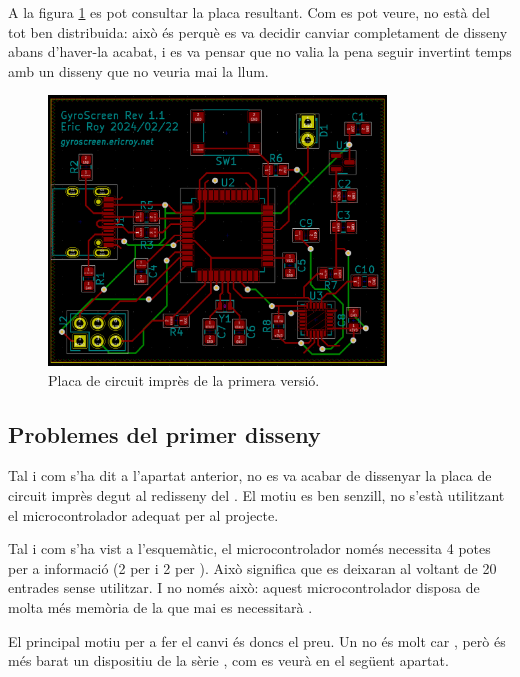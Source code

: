 A la figura \ref{fig:pcb_v1} es pot consultar la placa resultant. Com es pot veure,
no està del tot ben distribuida: això és perquè es va decidir canviar completament
de disseny abans d'haver-la acabat, i es va pensar que no valia la pena seguir
invertint temps amb un disseny que no veuria mai la llum.

\begin{figure}[ht]
    \centering
    \includegraphics[width=0.8\textwidth]{images/kicad/gyro1_pcb.png}
    \caption{Placa de circuit imprès de la primera versió.}
    \label{fig:pcb_v1}
\end{figure}

\subsection{Problemes del primer disseny}

Tal i com s'ha dit a l'apartat anterior, no es va acabar de dissenyar la placa
de circuit imprès degut al redisseny del . El motiu es ben senzill,
no s'està utilitzant el microcontrolador adequat per al projecte.

Tal i com s'ha vist a l'esquemàtic, el microcontrolador només necessita 4 potes
per a informació (2 per  i 2 per ). Això significa que es
deixaran al voltant de 20 entrades sense utilitzar. I no només això: aquest
microcontrolador disposa de molta més memòria de la que mai es necessitarà
\cite{AtMega32u4}.

El principal motiu per a fer el canvi és doncs el preu. Un 
no és molt car \cite{AvrComparison}, però és més barat un dispositiu 
de la sèrie , com es veurà en el següent apartat.

